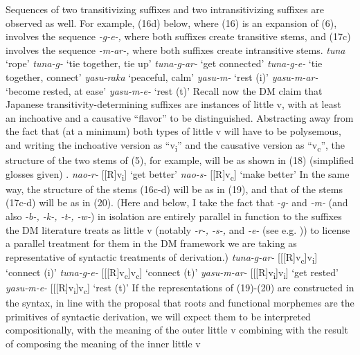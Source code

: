 \documentclass[output=paper,
modfonts
]{LSP/langsci}
\begin{document}
Sequences of two transitivizing suffixes and two intransitivizing
suffixes are observed as well. For example, (16d) below, where (16) is
an expansion of (6), involves the sequence \textit{-g-e-,} where both
suffixes create transitive stems, and (17c) involves the sequence
\textit{-m-ar-,} where both suffixes create intransitive stems.
\ea
	 \ea \textit{tuna} `rope'
	 \ex \textit{tuna-g-} `tie together, tie up'
	 \ex \textit{tuna-g-ar-} `get connected'
	 \ex \textit{tuna-g-e-} `tie together, connect'
	\z
\ex 
	 \ea \textit{yasu-raka} `peaceful, calm'
	 \ex \textit{yasu-m-} `rest (i)'
	 \ex \textit{yasu-m-ar-} `become rested, at ease'
	 \ex \textit{yasu-m-e-} `rest (t)'
	\z
\z
Recall now the DM claim that Japanese transitivity-determining suffixes
are instances of little v, with at least an inchoative and a causative
``flavor'' \citep[107]{marantz2013a} to be distinguished. Abstracting away from
the fact that (at a minimum) both types of little v will have to be
polysemous, and writing the inchoative version as ``v\textsubscript{i}''
and the causative version as ``v\textsubscript{c}'', the structure of
the two stems of (5), for example, will be as shown in (18) (simplified
glosses given) .
\ea
	\ea \textit{nao-r-} {[}{[}R{]}v\textsubscript{i}{]} `get better'
	\ex \textit{nao-s-} {[}{[}R{]}v\textsubscript{c}{]} `make better'
	\z
\z
In the same way, the structure of the stems (16c-d) will be as in
(19), and that of the stems (17c-d) will be as in (20). (Here and
below, I take the fact that \textit{-g-} and \textit{-m-} (and also
\textit{-b-, -k-, -t-, -w-}) in isolation are entirely parallel in
function to the suffixes the DM literature treats as little v (notably
\textit{-r-, -s-,} and \textit{-e-} (see e.g. \citealt[108]{marantz2013a})) to license
a parallel treatment for them in the DM framework we are taking as
representative of syntactic treatments of derivation.)
\ea
	\ea \textit{tuna-g-ar-} {[}{[}{[}R{]}v\textsubscript{c}{]}v\textsubscript{i}{]} `connect (i)'
	\ex \textit{tuna-g-e-} {[}{[}{[}R{]}v\textsubscript{c}{]}v\textsubscript{c}{]} `connect (t)'
	\z
\ex 
	\ea \textit{yasu-m-ar-} {[}{[}{[}R{]}v\textsubscript{i}{]}v\textsubscript{i}{]} `get rested'
	\ex \textit{yasu-m-e-} {[}{[}{[}R{]}v\textsubscript{i}{]}v\textsubscript{c}{]} `rest (t)'
	\z
\z
If the representations of (19)-(20) are constructed in the syntax, in
line with the proposal that roots and functional morphemes are the
primitives of syntactic derivation, we will expect them to be
interpreted compositionally, with the meaning of the outer little v
combining with the result of composing the meaning of the inner little v
\end{document}
